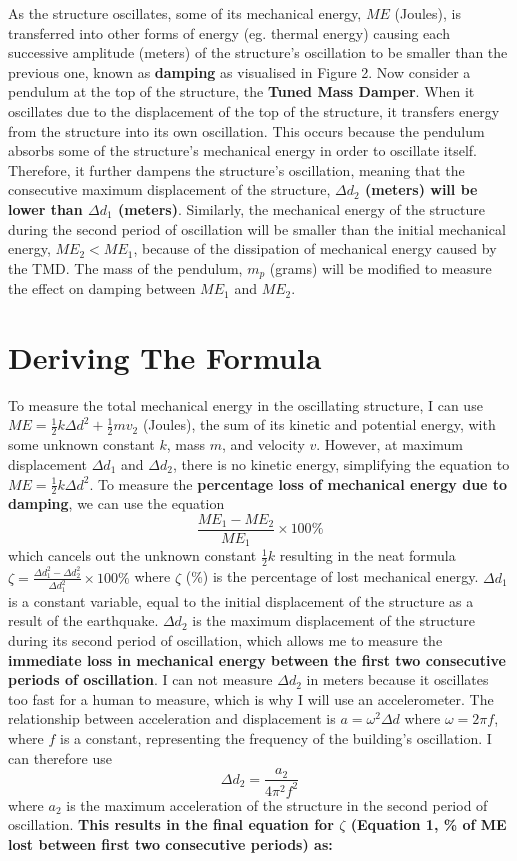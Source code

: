 \documentclass[11pt]{article}
\begin{document}
As the structure oscillates, some of its mechanical energy, $ME$ (Joules), is transferred into other forms of energy (eg. thermal energy) causing each successive amplitude (meters) of the structure’s oscillation to be smaller than the previous one, known as\textbf{ damping }as visualised in Figure 2. Now consider a pendulum at the top of the structure, the \textbf{Tuned Mass Damper}. When it oscillates due to the displacement of the top of the structure, it transfers energy from the structure into its own oscillation. This occurs because the pendulum absorbs some of the structure's mechanical energy in order to oscillate itself. Therefore, it further dampens the structure’s oscillation, meaning that the consecutive maximum displacement of the structure, \textbf{$\Delta d_2$ (meters) will be lower than $\Delta d_1$ (meters)}. Similarly, the mechanical energy of the structure during the second period of oscillation will be smaller than the initial mechanical energy, $ME_2 < ME_1$, because of the dissipation of mechanical energy caused by the TMD. The mass of the pendulum, $m_p$ (grams) will be modified to measure the effect on damping between $ME_1$ and $ME_2$.

\section{Deriving The Formula}

To measure the total mechanical energy in the oscillating structure, I can use $ME=\frac{1}{2}k\Delta d ^2+\frac{1}{2}mv_2$ (Joules), the sum of its kinetic and potential energy, with some unknown constant $k$, mass $m$, and velocity $v$. However, at maximum displacement $\Delta d_1$ and $\Delta d_2$, there is no kinetic energy, simplifying the equation to $ME=\frac{1}{2}k \Delta d^2$. To measure the \textbf{percentage loss of mechanical energy due to damping}, we can use the equation $$\frac{ME_1-ME_2}{ME_1}\times100\%$$ which cancels out the unknown constant $\frac{1}{2}k$ resulting in the neat formula $\zeta=\frac{\Delta d_1^2-\Delta d_2^2}{\Delta d_1^2}\times100\%$ where $\zeta$ (\%) is the percentage of lost mechanical energy.
$\Delta d_1$ is a constant variable, equal to the initial displacement of the structure as a result of the earthquake. $\Delta d_2$ is the maximum displacement of the structure during its second period of oscillation, which allows me to measure the \textbf{immediate loss in mechanical energy between the first two consecutive periods of oscillation}. I can not measure $\Delta d_2$ in meters because it oscillates too fast for a human to measure, which is why I will use an accelerometer. The relationship between acceleration and displacement is $a=\omega ^2 \Delta d$ where $\omega=2\pi f$, where $f$ is a constant, representing the frequency of the building’s oscillation. I can therefore use $$\Delta d_2=\frac{a_2}{4\pi^2f^2}$$ where $a_2$ is the maximum acceleration of the structure in the second period of oscillation. \textbf{This results in the final equation for $\zeta$ (Equation 1, \% of ME lost between first two consecutive periods) as:}
\end{document}
